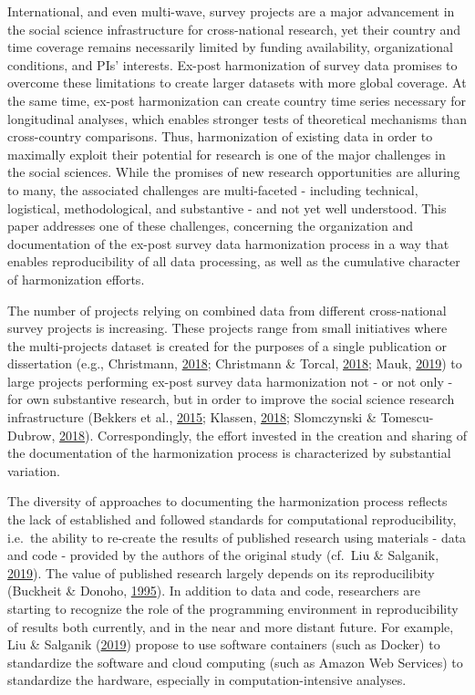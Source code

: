 \documentclass[12pt,]{article}
\begin{document}
International, and even multi-wave, survey projects are a major advancement in the social science infrastructure for cross-national research, yet their country and time coverage remains necessarily limited by funding availability, organizational conditions, and PIs' interests. Ex-post harmonization of survey data promises to overcome these limitations to create larger datasets with more global coverage. At the same time, ex-post harmonization can create country time series necessary for longitudinal analyses, which enables stronger tests of theoretical mechanisms than cross-country comparisons. Thus, harmonization of existing data in order to maximally exploit their potential for research is one of the major challenges in the social sciences. While the promises of new research opportunities are alluring to many, the associated challenges are multi-faceted - including technical, logistical, methodological, and substantive - and not yet well understood. This paper addresses one of these challenges, concerning the organization and documentation of the ex-post survey data harmonization process in a way that enables reproducibility of all data processing, as well as the cumulative character of harmonization efforts.

The number of projects relying on combined data from different cross-national survey projects is increasing. These projects range from small initiatives where the multi-projects dataset is created for the purposes of a single publication or dissertation (e.g., Christmann, \protect\hyperlink{ref-Christmann2018}{2018}; Christmann \& Torcal, \protect\hyperlink{ref-Christmann2018a}{2018}; Mauk, \protect\hyperlink{ref-Mauk2019}{2019}) to large projects performing ex-post survey data harmonization not - or not only - for own substantive research, but in order to improve the social science research infrastructure (Bekkers et al., \protect\hyperlink{ref-Bekkers2015}{2015}; Klassen, \protect\hyperlink{ref-Klassen2018}{2018}; Slomczynski \& Tomescu-Dubrow, \protect\hyperlink{ref-Slomczynski2018}{2018}). Correspondingly, the effort invested in the creation and sharing of the documentation of the harmonization process is characterized by substantial variation.

The diversity of approaches to documenting the harmonization process reflects the lack of established and followed standards for computational reproducibility, i.e.~the ability to re-create the results of published research using materials - data and code - provided by the authors of the original study (cf.~Liu \& Salganik, \protect\hyperlink{ref-Liu2019}{2019}). The value of published research largely depends on its reproducilibity (Buckheit \& Donoho, \protect\hyperlink{ref-Buckheit1995}{1995}). In addition to data and code, researchers are starting to recognize the role of the programming environment in reproducibility of results both currently, and in the near and more distant future. For example, Liu \& Salganik (\protect\hyperlink{ref-Liu2019}{2019}) propose to use software containers (such as Docker) to standardize the software and cloud computing (such as Amazon Web Services) to standardize the hardware, especially in computation-intensive analyses.
\end{document}
